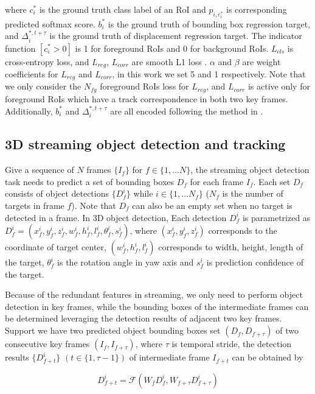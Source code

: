 \documentclass{bmvc2k}
\begin{document}
where $c^*_i$ is the ground truth class label of an RoI and $p_{i, c^*_i}$ is corresponding predicted softmax score. $b^*_i$ is the ground truth of bounding box regression target, and $\Delta^{*, t+\tau}_i$ is the ground truth of displacement regression target. The indicator function $ [c^*_i > 0]$ is 1 for foreground RoIs and 0 for background RoIs. $L_{cls}$ is cross-entropy loss, and $L_{reg}$, $L_{corr}$ are smooth L1 loss \cite{girshick2015fast}. $\alpha$ and $\beta$ are weight coefficients for $L_{reg}$ and $L_{corr}$, in this work we set 5 and 1 respectively. Note that we only consider the $N_{fg}$ foreground RoIs loss for $L_{reg}$, and $L_{corr}$ is active only for foreground RoIs which have a track correspondence in both two key frames. Additionally, $b^*_i$ and $ \Delta^{*, t+\tau}_i$ are all encoded following the method in \cite{ku2018joint}.

\subsection{3D streaming object detection and tracking}
Give a sequence of $N$ frames $\{I_f\}$ for $f \in \{1, ... N\}$, the streaming object detection task needs to predict a set of bounding boxes $D_f$ for each frame $I_f$. Each set $D_f$ consists of object detections $\{D^i_f\}$ while $i \in \{1,...N_f\}$ ($N_f$ is the number of targets in frame $f$). Note that $D_f$ can also be an empty set when no target is detected in a frame. In 3D object detection, Each detection $D^i_f$ is parametrized as $D^i_f = (x^i_f, y^i_f, z^i_f, w^i_f, h^i_f, l^i_f, \theta^i_f, s^i_f)$, where $(x^i_f, y^i_f, z^i_f)$ corresponds to the coordinate of target center, $(w^i_f, h^i_f, l^i_f)$ corresponds to width, height, length of the target, $\theta^i_f$ is the rotation angle in yaw axis and $s^i_f$ is prediction confidence of the target.

Because of the redundant features in streaming, we only need to perform object detection in key frames, while the bounding boxes of the intermediate frames can be determined leveraging the detection results of adjacent two key frames. Support we have two predicted object bounding boxes set $(D_f, D_{f+\tau})$ of two consecutive key frames $(I_f, I_{f+\tau})$, where $\tau$ is temporal stride, the detection results $\{D^i_{f+t}\}$ $(t \in \{1, \tau-1\})$ of intermediate frame $I_{f+t}$ can be obtained by

\begin{equation}
D^i_{f+t} = \mathcal{F}(W_f D^i_f, W_{f+\tau} D^i_{f+\tau})
\end{equation}
\end{document}
